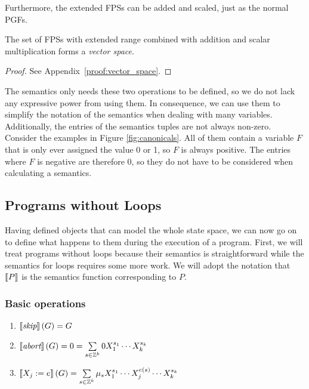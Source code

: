 Furthermore, the extended FPSs can be added and scaled, just as the normal PGFs.
\begin{theorem}[label=theo:ext:vectorspace]
	The set of FPSs with extended range combined with addition and scalar multiplication forms a \emph{vector space}.
	\begin{proof}
		See Appendix~\ref{proof:vector_space}.
	\end{proof}
\end{theorem}
The semantics only needs these two operations to be defined, so we do not lack any expressive power from using them.
In consequence, we can use them to simplify the notation of the semantics when dealing with many variables.
Additionally, the entries of the semantics tuples are not always non-zero.
Consider the examples in Figure \ref{fig:canonicals}.
All of them contain a variable $F$ that is only ever assigned the value 0 or 1, so $F$ is always positive.
The entries where $F$ is negative are therefore 0, so they do not have to be considered when calculating a semantics.

\subsection{Programs without Loops}
Having defined objects that can model the whole state space, we can now go on to define what happens to them during the execution of a program.
First, we will treat programs without loops because their semantics is straightforward while the semantics for loops requires some more work.
We will adopt the notation that $\left\llbracket P \right\rrbracket$ is the semantics function corresponding to $P$.

\subsubsection*{Basic operations}
\begin{enumerate}
	\item $\left\llbracket \textit{skip} \right\rrbracket(G) = G$
	\item $\left\llbracket \textit{abort} \right\rrbracket(G) = 0 = \sum\limits_{s \in \mathbb{Z}^k} 0 X_1^{s_1} \cdots X_k^{s_k}$
	\item $\left\llbracket X_j := e \right\rrbracket(G) = \sum\limits_{s \in \mathbb{Z}^k} \mu_s X_1^{s_1} \cdots X_j^{e(s)} \cdots X_k^{s_k}$
\end{enumerate}
